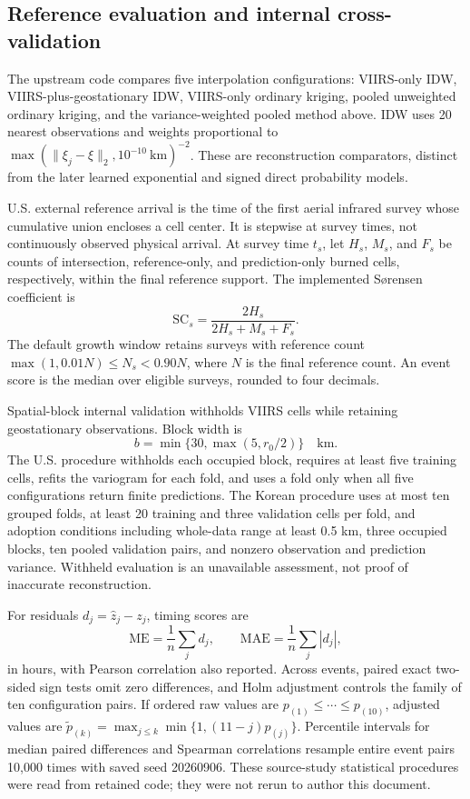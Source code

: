 \documentclass[11pt,a4paper]{article}
\begin{document}
\subsection{Reference evaluation and internal cross-validation}
The upstream code compares five interpolation configurations: VIIRS-only IDW,
VIIRS-plus-geostationary IDW, VIIRS-only ordinary kriging, pooled unweighted
ordinary kriging, and the variance-weighted pooled method above. IDW uses
20 nearest observations and weights proportional to
$\max(\|\xi_j-\xi\|_2,10^{-10}\ \mathrm{km})^{-2}$.
These are reconstruction comparators, distinct from the later learned
exponential and signed direct probability models.

U.S. external reference arrival is the time of the first aerial infrared survey
whose cumulative union encloses a cell center. It is stepwise at survey times,
not continuously observed physical arrival. At survey time $t_s$, let $H_s$,
$M_s$, and $F_s$ be counts of intersection, reference-only, and prediction-only
burned cells, respectively, within the final reference support. The implemented
S\o rensen coefficient is
\begin{equation}
\mathrm{SC}_s=\frac{2H_s}{2H_s+M_s+F_s}.
\end{equation}
The default growth window retains surveys with reference count
$\max(1,0.01N)\le N_s<0.90N$, where $N$ is the final reference count. An event
score is the median over eligible surveys, rounded to four decimals.

Spatial-block internal validation withholds VIIRS cells while retaining
geostationary observations. Block width is
\begin{equation}
b=\min\{30,\max(5,r_0/2)\}\quad\mathrm{km}.
\end{equation}
The U.S. procedure withholds each occupied block, requires at least five
training cells, refits the variogram for each fold, and uses a fold only when
all five configurations return finite predictions. The Korean procedure uses
at most ten grouped folds, at least 20 training and three validation cells
per fold, and adoption conditions including whole-data range at least 0.5 km,
three occupied blocks, ten pooled validation pairs, and nonzero observation
and prediction variance. Withheld evaluation is an unavailable assessment,
not proof of inaccurate reconstruction.

For residuals $d_j=\widehat z_j-z_j$, timing scores are
\begin{equation}
\mathrm{ME}=\frac1n\sum_jd_j,\qquad
\mathrm{MAE}=\frac1n\sum_j|d_j|,
\end{equation}
in hours, with Pearson correlation also reported. Across events, paired exact
two-sided sign tests omit zero differences, and Holm adjustment controls the
family of ten configuration pairs. If ordered raw values are $p_{(1)}\le
\cdots\le p_{(10)}$, adjusted values are
$\widetilde p_{(k)}=\max_{j\le k}\min\{1,(11-j)p_{(j)}\}$.
Percentile intervals for median paired differences and Spearman correlations
resample entire event pairs 10,000 times with saved seed 20260906.
These source-study statistical procedures were read from retained code;
they were not rerun to author this document.
\end{document}
